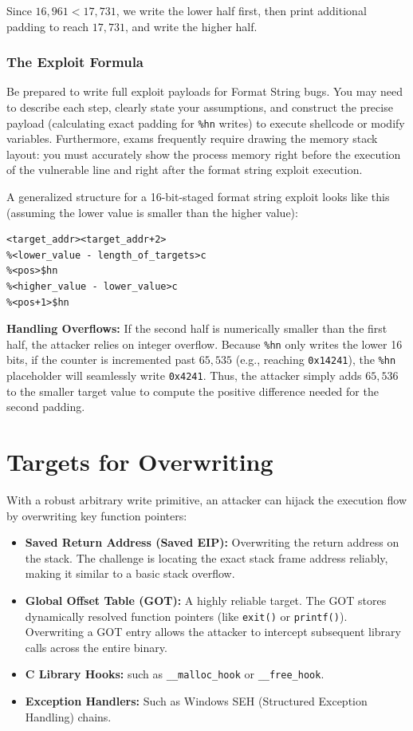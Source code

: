 Since $16,961 < 17,731$, we write the lower half first, then print additional padding to reach $17,731$, and write the higher half.

\subsubsection{The Exploit Formula}

\begin{tcolorbox}[colback=blue!5!white,colframe=blue!75!black,title=Exam Insight]
Be prepared to write full exploit payloads for Format String bugs. You may need to describe each step, clearly state your assumptions, and construct the precise payload (calculating exact padding for \texttt{\%hn} writes) to execute shellcode or modify variables. Furthermore, exams frequently require drawing the memory stack layout: you must accurately show the process memory right before the execution of the vulnerable line and right after the format string exploit execution.
\end{tcolorbox}


A generalized structure for a 16-bit-staged format string exploit looks like this (assuming the lower value is smaller than the higher value):

\begin{verbatim}
<target_addr><target_addr+2>
%<lower_value - length_of_targets>c
%<pos>$hn
%<higher_value - lower_value>c
%<pos+1>$hn
\end{verbatim}

\textbf{Handling Overflows:} If the second half is numerically smaller than the first half, the attacker relies on integer overflow. Because \texttt{\%hn} only writes the lower 16 bits, if the counter is incremented past $65,535$ (e.g., reaching \texttt{0x14241}), the \texttt{\%hn} placeholder will seamlessly write \texttt{0x4241}. Thus, the attacker simply adds $65,536$ to the smaller target value to compute the positive difference needed for the second padding.

\section{Targets for Overwriting}
With a robust arbitrary write primitive, an attacker can hijack the execution flow by overwriting key function pointers:
\begin{itemize}
    \item \textbf{Saved Return Address (Saved EIP):} Overwriting the return address on the stack. The challenge is locating the exact stack frame address reliably, making it similar to a basic stack overflow.
    \item \textbf{Global Offset Table (GOT):} A highly reliable target. The GOT stores dynamically resolved function pointers (like \texttt{exit()} or \texttt{printf()}). Overwriting a GOT entry allows the attacker to intercept subsequent library calls across the entire binary.
    \item \textbf{C Library Hooks:} such as \texttt{\_\_malloc\_hook} or \texttt{\_\_free\_hook}.
    \item \textbf{Exception Handlers:} Such as Windows SEH (Structured Exception Handling) chains.
\end{itemize}

